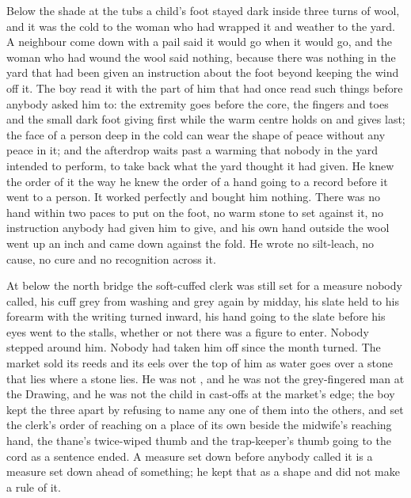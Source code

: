 \scenebreak

Below the shade at the tubs a child's foot stayed dark inside three turns of wool, and it was the cold to the woman who had wrapped it and weather to the yard. A neighbour come down with a pail said it would go when it would go, and the woman who had wound the wool said nothing, because there was nothing in the yard that had been given an instruction about the foot beyond keeping the wind off it. The boy read it with the part of him that had once read such things before anybody asked him to: the extremity goes before the core, the fingers and toes and the small dark foot giving first while the warm centre holds on and gives last; the face of a person deep in the cold can wear the shape of peace without any peace in it; and the afterdrop waits past a warming that nobody in the yard intended to perform, to take back what the yard thought it had given. He knew the order of it the way he knew the order of a hand going to a record before it went to a person. It worked perfectly and bought him nothing. There was no hand within two paces to put on the foot, no warm stone to set against it, no instruction anybody had given him to give, and his own hand outside the wool went up an inch and came down against the fold. He wrote no silt-leach, no cause, no cure and no recognition across it.

\scenebreak

At  below the north bridge the soft-cuffed clerk was still set for a measure nobody called, his cuff grey from washing and grey again by midday, his slate held to his forearm with the writing turned inward, his hand going to the slate before his eyes went to the stalls, whether or not there was a figure to enter. Nobody stepped around him. Nobody had taken him off since the month turned. The market sold its reeds and its eels over the top of him as water goes over a stone that lies where a stone lies. He was not , and he was not the grey-fingered man at the Drawing, and he was not the child in cast-offs at the market's edge; the boy kept the three apart by refusing to name any one of them into the others, and set the clerk's order of reaching on a place of its own beside the midwife's reaching hand, the thane's twice-wiped thumb and the trap-keeper's thumb going to the cord as a sentence ended. A measure set down before anybody called it is a measure set down ahead of something; he kept that as a shape and did not make a rule of it.

\scenebreak

